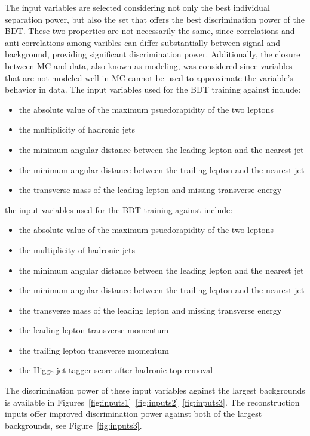 The input variables are selected considering not only the best individual separation power, but also the set that offers the best discrimination power of the BDT. These two
properties are not necessarily the same, since correlations and anti-correlations among varibles can differ substantially between signal and background, providing significant
discrimination power. Additionally, the closure between MC and data, also known as modeling, was considered since variables that are not modeled well in MC cannot be used to
approximate the variable's behavior in data. The input variables used for the BDT training against \ttbar include:
\begin{itemize}
\item the absolute value of the maximum psuedorapidity of the two leptons
\item the multiplicity of hadronic jets
\item the minimum angular distance between the leading lepton and the nearest jet
\item the minimum angular distance between the trailing lepton and the nearest jet
\item the transverse mass of the leading lepton and missing transverse energy
\end{itemize} 

\noindent the input variables used for the BDT training against \ttv include:
\begin{itemize}
\item the absolute value of the maximum psuedorapidity of the two leptons
\item the multiplicity of hadronic jets
\item the minimum angular distance between the leading lepton and the nearest jet
\item the minimum angular distance between the trailing lepton and the nearest jet
\item the transverse mass of the leading lepton and missing transverse energy
\item the leading lepton transverse momentum
\item the trailing lepton transverse momentum
\item the Higgs jet tagger score after hadronic top removal
\end{itemize} 

\noindent The discrimination power of these input variables against the largest backgrounds is available in Figures~\ref{fig:inputs1}~\ref{fig:inputs2}~\ref{fig:inputs3}.
The reconstruction inputs offer improved discrimination power against both of the largest backgrounds, see Figure~\ref{fig:inputs3}.

